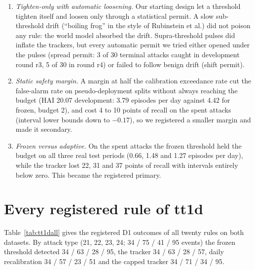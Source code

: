 \documentclass[sigconf,review,anonymous]{acmart}
\begin{document}
\begin{enumerate}
\item \emph{Tighten-only with automatic loosening.} Our starting design let a threshold tighten
  itself and loosen only through a statistical permit. A slow sub-threshold drift (``boiling frog''
  in the style of Rubinstein et al.) did not poison any rule: the world model absorbed the drift.
  Supra-threshold pulses did inflate the trackers, but every automatic permit we tried either opened
  under the pulses (spread permit: 3 of 30 terminal attacks caught in development round r3, 5 of 30
  in round r4) or failed to follow benign drift (shift permit).
\item \emph{Static safety margin.} A margin at half the calibration exceedance rate cut the
  false-alarm rate on pseudo-deployment splits without always reaching the budget (HAI 20.07
  development: 3.79 episodes per day against 4.42 for frozen, budget 2), and cost 4 to 10 points of
  recall on the spent attacks (interval lower bounds down to $-0.17$), so we registered a smaller
  margin and made it secondary.
\item \emph{Frozen versus adaptive.} On the spent attacks the frozen threshold held the budget on
  all three real test periods (0.66, 1.48 and 1.27 episodes per day), while the tracker lost 22, 31
  and 37 points of recall with intervals entirely below zero. This became the registered primary.
\end{enumerate}

\FloatBarrier
\section{Every registered rule of tt1d}
\label{app:tt1d}

Table~\ref{tab:tt1dall} gives the registered D1 outcomes of all twenty rules on both datasets. By attack
type (21, 22, 23, 24; 34 / 75 / 41 / 95 events) the frozen threshold detected 34 / 63 / 28 / 95, the tracker
34 / 63 / 28 / 57, daily recalibration 34 / 57 / 23 / 51 and the capped tracker 34 / 71 / 34 / 95.
\end{document}
